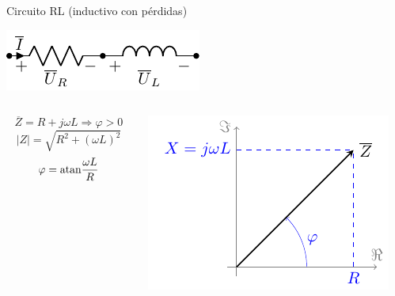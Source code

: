 \documentclass[aspectratio=169, usenames,svgnames,dvipsnames]{beamer}
\begin{document}
\begin{frame}[label={sec:org81cfe3d}]{Circuito RL (inductivo con pérdidas)}
\begin{center}
\includegraphics[height=0.2\textheight]{../figs/RL.pdf}
\end{center}
\begin{columns}
\begin{column}{0.45\columnwidth}
\[
\overline{Z} = R + j\omega L \Rightarrow \boxed{\varphi > 0}
\]
\[
  |Z| = \sqrt{R^2 + (\omega L)^2}
\]
\[
  \varphi = \mathrm{atan}{\dfrac{\omega L}{R}}
\]
\end{column}
\begin{column}{0.55\columnwidth}
\begin{center}
\includegraphics[width=.9\linewidth]{../figs/fasorInductanciaReal.pdf}
\end{center}
\end{column}
\end{columns}
\end{frame}
\end{document}
